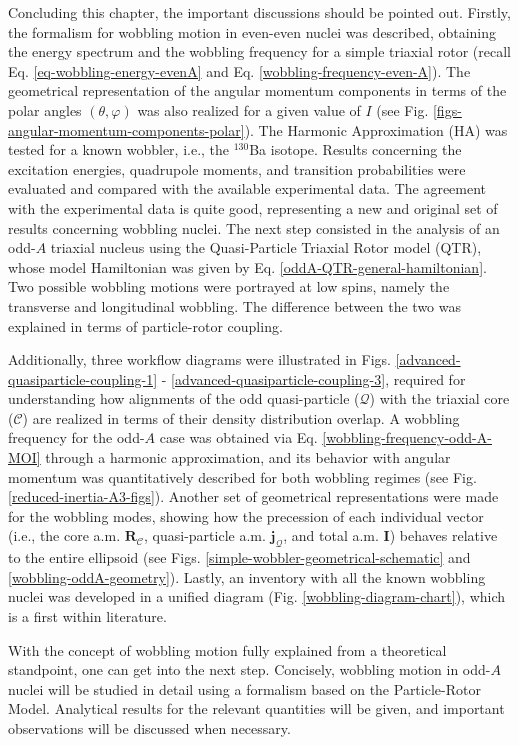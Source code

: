 Concluding this chapter, the important discussions should be pointed out. Firstly, the formalism for wobbling motion in even-even nuclei was described, obtaining the energy spectrum and the wobbling frequency for a simple triaxial rotor (recall Eq. \ref{eq-wobbling-energy-evenA} and Eq. \ref{wobbling-frequency-even-A}). The geometrical representation of the angular momentum components in terms of the polar angles $(\theta,\varphi)$ was also realized for a given value of $I$ (see Fig. \ref{figs-angular-momentum-components-polar}). The Harmonic Approximation (HA) was tested for a known wobbler, i.e., the $^{130}$Ba isotope. Results concerning the excitation energies, quadrupole moments, and transition probabilities were evaluated and compared with the available experimental data. The agreement with the experimental data is quite good, representing a new and original set of results concerning wobbling nuclei. The next step consisted in the analysis of an odd-$A$ triaxial nucleus using the Quasi-Particle Triaxial Rotor model (QTR), whose model Hamiltonian was given by Eq. \ref{oddA-QTR-general-hamiltonian}. Two possible wobbling motions were portrayed at low spins, namely the transverse and longitudinal wobbling. The difference between the two was explained in terms of particle-rotor coupling. 

Additionally, three workflow diagrams were illustrated in Figs. \ref{advanced-quasiparticle-coupling-1} - \ref{advanced-quasiparticle-coupling-3}, required for understanding how alignments of the odd quasi-particle ($\mathcal{Q}$) with the triaxial core ($\mathscr{C}$) are realized in terms of their density distribution overlap. A wobbling frequency for the odd-$A$ case was obtained via Eq. \ref{wobbling-frequency-odd-A-MOI} through a harmonic approximation, and its behavior with angular momentum was quantitatively described for both wobbling regimes (see Fig. \ref{reduced-inertia-A3-figs}). Another set of geometrical representations were made for the wobbling modes, showing how the precession of each individual vector (i.e., the core a.m. $\mathbf{R}_\mathscr{C}$, quasi-particle a.m. $\mathbf{j}_\mathcal{Q}$, and total a.m. $\mathbf{I}$) behaves relative to the entire ellipsoid (see Figs. \ref{simple-wobbler-geometrical-schematic} and \ref{wobbling-oddA-geometry}). Lastly, an inventory with all the known wobbling nuclei was developed in a unified diagram (Fig. \ref{wobbling-diagram-chart}), which is a first within literature.

With the concept of wobbling motion fully explained from a theoretical standpoint, one can get into the next step. Concisely, wobbling motion in odd-$A$ nuclei will be studied in detail using a formalism based on the Particle-Rotor Model. Analytical results for the relevant quantities will be given, and important observations will be discussed when necessary.